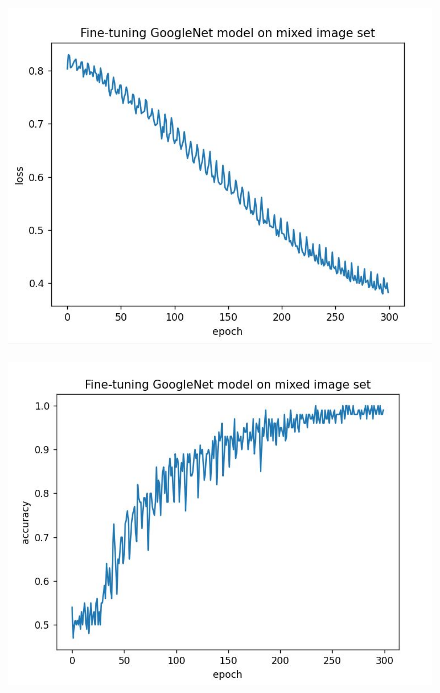 \documentclass[conference]{IEEEtran}
\begin{document}
\begin{figure}[h]
  \centering
    \begin{minipage}{.24\textwidth}
      \centering
      \includegraphics[width=0.9\linewidth]{googlenet_mixed_loss.jpg}
      \label{fig:test1}
    \end{minipage}%
    \begin{minipage}{.24\textwidth}
      \centering
      \includegraphics[width=0.9\linewidth]{googlenet_mixed_accuracy.jpg}
      \label{fig:test2}
    \end{minipage}
\end{figure}
\end{document}
